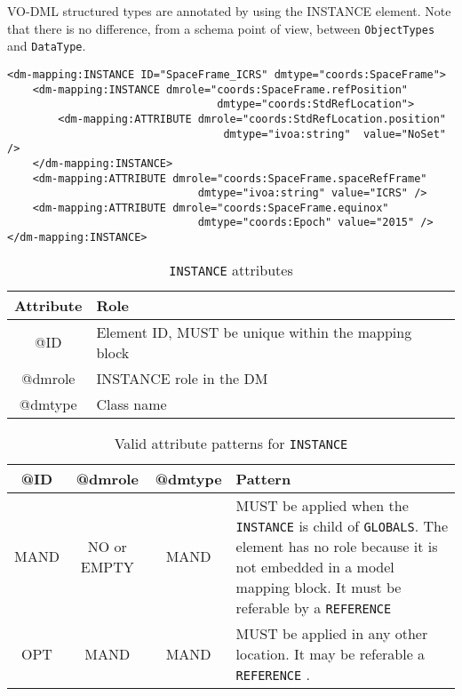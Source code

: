 VO-DML structured types are annotated by using the INSTANCE
element. Note that there is no difference, from a schema point of view,
between \texttt{ObjectTypes} and \texttt{DataType}.

 \begin{lstlisting}[caption={INSTANCE child of GLOBALS},style=XML,basicstyle=\small]
<dm-mapping:INSTANCE ID="SpaceFrame_ICRS" dmtype="coords:SpaceFrame">
	<dm-mapping:INSTANCE dmrole="coords:SpaceFrame.refPosition"
                                 dmtype="coords:StdRefLocation">
		<dm-mapping:ATTRIBUTE dmrole="coords:StdRefLocation.position" 
		                          dmtype="ivoa:string"  value="NoSet" />
	</dm-mapping:INSTANCE>
	<dm-mapping:ATTRIBUTE dmrole="coords:SpaceFrame.spaceRefFrame" 
	                          dmtype="ivoa:string" value="ICRS" />
	<dm-mapping:ATTRIBUTE dmrole="coords:SpaceFrame.equinox" 
	                          dmtype="coords:Epoch"	value="2015" />
</dm-mapping:INSTANCE>
\end{lstlisting}

\begin{table}[!htbp]
\small
\centering
\begin{tabulary}{\linewidth}{|c|J|}       
       \hline 
            \textbf{Attribute} & 
            \textbf {Role}\\
       \hline         \hline  
            @ID & 
            Element ID, MUST be unique within the mapping block  \\
        \hline 
            @dmrole & 
            INSTANCE role in the DM \\
        \hline 
            @dmtype & 
            Class name \\
        \hline 
     \end{tabulary}
     \caption{\texttt{INSTANCE} attributes} 
     \label{tbl:instance-att}
 \end{table}

\begin{table}[!htbp]
\small
\centering
\begin{tabulary}{\linewidth}{|c|c|c|J|}
    \hline 
        \textbf{@ID} &
        \textbf{@dmrole} &
        \textbf{@dmtype} &
        \textbf{Pattern}\\
    \hline      \hline  
        MAND &           
        NO or EMPTY&           
        MAND &           
        MUST be applied when the  \texttt{INSTANCE} is child of \texttt{GLOBALS}. The element has no role because it is not embedded in a model mapping block. It must be referable by a \texttt{REFERENCE}  \\
    \hline   
        OPT &           
        MAND &           
        MAND &           
        MUST be applied in any other location. It may be referable a \texttt{REFERENCE} . \\
   \hline 
\end{tabulary}
     \caption{Valid attribute patterns for  \texttt{INSTANCE}} 
     \label{tbl:instance-pattern}
 \end{table}


